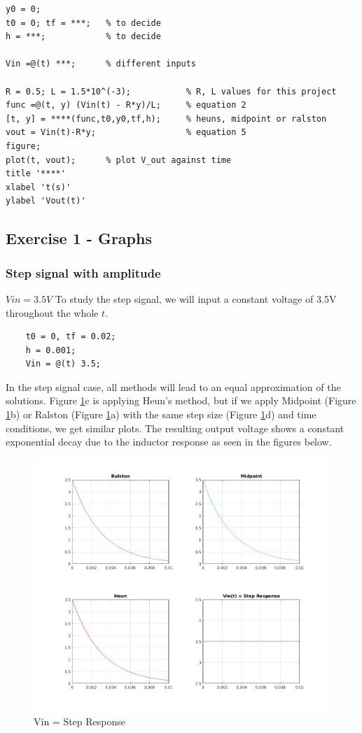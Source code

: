 \documentclass[11pt,a4paper]{article}
\begin{document}
\begin{verbatim}
y0 = 0;
t0 = 0; tf = ***;   % to decide
h = ***;            % to decide

Vin =@(t) ***;      % different inputs

R = 0.5; L = 1.5*10^(-3);           % R, L values for this project
func =@(t, y) (Vin(t) - R*y)/L;     % equation 2
[t, y] = ****(func,t0,y0,tf,h);     % heuns, midpoint or ralston
vout = Vin(t)-R*y;                  % equation 5
figure;
plot(t, vout);      % plot V_out against time
title '****'
xlabel 't(s)'
ylabel 'Vout(t)'

\end{verbatim}
\newpage

\subsection{Exercise 1 - Graphs}
\subsubsection{Step signal with amplitude}
	$Vin = 3.5V$
To study the step signal, we will input a constant voltage of 3.5V throughout the whole $t$.
\begin{verbatim}
	t0 = 0, tf = 0.02;
	h = 0.001;
	Vin = @(t) 3.5;
\end{verbatim}

In the step signal case, all methods will lead to an equal approximation of the solutions. Figure \ref{fig:RL2}c is applying Heun's method, but if we apply Midpoint (Figure \ref{fig:RL2}b) or Ralston (Figure \ref{fig:RL2}a) with the same step size (Figure \ref{fig:RL2}d) and time conditions, we get similar plots. The resulting output voltage shows a constant exponential decay due to the inductor response as seen in the figures below.

\begin{figure}[h]
	\includegraphics[width=\textwidth]{Ex1_Figs/substep.jpg}
	\vspace{-6mm}
	\caption{Vin = Step Response}
	\label{fig:RL2}
\end{figure}
\end{document}
